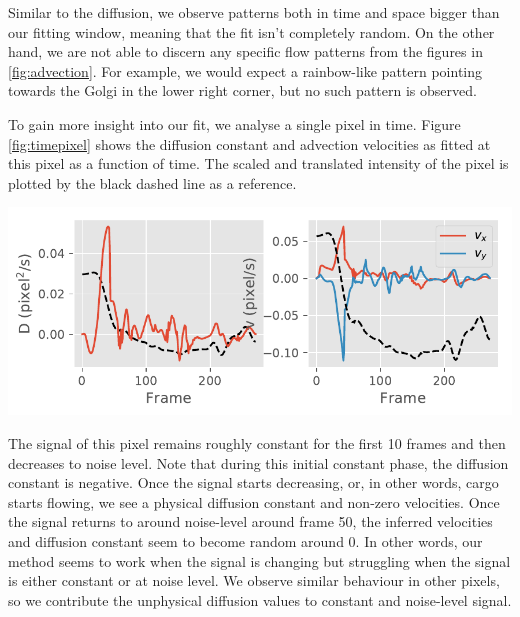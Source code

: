 \documentclass{Dissertate}
\let\origfigure\figure
\let\endorigfigure\endfigure
\renewenvironment{figure}[1][2] {
    \expandafter\origfigure\expandafter[H]
} {
    \endorigfigure
}
\begin{document}
Similar to the diffusion, we observe patterns both in time and space
bigger than our fitting window, meaning that the fit isn't completely
random. On the other hand, we are not able to discern any specific flow patterns from the figures in \ref{fig:advection}. For example, we would expect a rainbow-like pattern pointing towards the Golgi
 in the lower right corner, but no such pattern is observed.
 
To gain more insight into
our fit, we analyse a single pixel in time. Figure
\ref{fig:timepixel} shows the diffusion constant and advection velocities as fitted at this pixel as a function of time. The scaled and translated intensity of the pixel is plotted by the black dashed line as a reference.


\begin{figure}
\hypertarget{fig:timepixel}{%
\centering
\includegraphics{source/figures/pdf/general_fit.pdf}
\caption{Diffusion and advection velocities of a single pixel in time.
We've plotted the scaled and translated signal as a black dashed line to
show the correlation.}\label{fig:timepixel}
}
\end{figure}

The signal of this pixel remains roughly constant for the first 10 frames and then decreases to noise level. Note that during this initial constant phase, the diffusion constant is negative. Once the signal starts
decreasing, or, in other words, cargo starts flowing, we
see a physical diffusion constant and non-zero velocities. Once the
signal returns to around noise-level around frame 50, the inferred
velocities and diffusion constant seem to become random around 0. In
other words, our method seems to work when the signal is changing but
struggling when the signal is either constant or at noise level. We
observe similar behaviour in other pixels, so we contribute the unphysical diffusion values to constant and noise-level signal.
\end{document}
